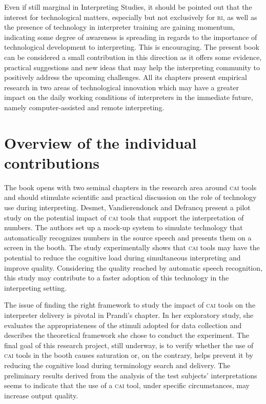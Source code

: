 \documentclass[output=paper]{langsci/langscibook}
\begin{document}
Even if still marginal in Interpreting Studies, it should be pointed out that the interest for technological matters, especially but not exclusively for \textsc{ri}, as well as the presence of technology in interpreter training are gaining momentum, indicating some degree of awareness is spreading in regards to the importance of technological development to interpreting. This is encouraging. The present book can be considered a small contribution in this direction as it offers some evidence, practical suggestions and new ideas that may help the interpreting community to positively address the upcoming challenges. All its chapters present empirical research in two areas of technological innovation which may have a greater impact on the daily working conditions of interpreters in the immediate future, namely computer-assisted and remote interpreting. 
 
\section{Overview of the individual contributions}\largerpage[-1]
 
The book opens with two seminal chapters in the research area around \textsc{cai} tools and should stimulate scientific and practical discussion on the role of technology use during interpreting. Desmet, Vandierendonck and Defrancq present a pilot study on the potential impact of \textsc{cai} tools that support the interpretation of numbers. The authors set up a mock-up system to simulate technology that automatically recognizes numbers in the source speech and presents them on a screen in the booth. The study experimentally shows that \textsc{cai} tools may have the potential to reduce the cognitive load during simultaneous interpreting and improve quality. Considering the quality reached by automatic speech recognition, this study may contribute to a faster adoption of this technology in the interpreting setting. 

The issue of finding the right framework to study the impact of \textsc{cai} tools on the interpreter delivery is pivotal in Prandi’s chapter. In her exploratory study, she evaluates the appropriateness of the stimuli adopted for data collection and describes the theoretical framework she chose to conduct the experiment. The final goal of this research project, still underway, is to verify whether the use of \textsc{cai} tools in the booth causes saturation or, on the contrary, helps prevent it by reducing the cognitive load during terminology search and delivery. The preliminary results derived from the analysis of the test subjects’ interpretations seems to indicate that the use of a \textsc{cai} tool, under specific circumstances, may increase output quality. 
 
\end{document}
